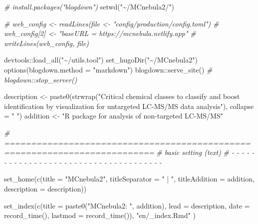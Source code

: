 \documentclass[
]{article}
\newenvironment{Shaded}{\begin{snugshade}}{\end{snugshade}}
\newcommand{\AttributeTok}[1]{\textcolor[rgb]{0.77,0.63,0.00}{#1}}
\newcommand{\CommentTok}[1]{\textcolor[rgb]{0.56,0.35,0.01}{\textit{#1}}}
\newcommand{\FunctionTok}[1]{\textcolor[rgb]{0.00,0.00,0.00}{#1}}
\newcommand{\NormalTok}[1]{#1}
\newcommand{\OtherTok}[1]{\textcolor[rgb]{0.56,0.35,0.01}{#1}}
\newcommand{\SpecialCharTok}[1]{\textcolor[rgb]{0.00,0.00,0.00}{#1}}
\newcommand{\StringTok}[1]{\textcolor[rgb]{0.31,0.60,0.02}{#1}}
\begin{document}
\begin{Shaded}
\begin{Highlighting}[]
\CommentTok{\# install.packages("blogdown")}
\FunctionTok{setwd}\NormalTok{(}\StringTok{"\textasciitilde{}/MCnebula2/"}\NormalTok{)}

\CommentTok{\# web\_config \textless{}{-} readLines(file \textless{}{-} "config/production/config.toml")}
\CommentTok{\# web\_config[2] \textless{}{-} "baseURL = \textquotesingle{}https://mcnebula.netlify.app\textquotesingle{}"}
\CommentTok{\# writeLines(web\_config, file)}

\NormalTok{devtools}\SpecialCharTok{::}\FunctionTok{load\_all}\NormalTok{(}\StringTok{"\textasciitilde{}/utils.tool"}\NormalTok{)}
\FunctionTok{set\_hugoDir}\NormalTok{(}\StringTok{"\textasciitilde{}/MCnebula2"}\NormalTok{)}
\FunctionTok{options}\NormalTok{(}\AttributeTok{blogdown.method =} \StringTok{"markdown"}\NormalTok{)}
\NormalTok{blogdown}\SpecialCharTok{::}\FunctionTok{serve\_site}\NormalTok{()}
\CommentTok{\# blogdown::stop\_server()}

\NormalTok{description }\OtherTok{\textless{}{-}} \FunctionTok{paste0}\NormalTok{(}\FunctionTok{strwrap}\NormalTok{(}\StringTok{"Critical chemical classes to classify and boost}
\StringTok{    identification by visualization for untargeted LC{-}MS/MS data analysis"}\NormalTok{),}
    \AttributeTok{collapse =} \StringTok{" "}\NormalTok{)}
\NormalTok{addition }\OtherTok{\textless{}{-}} \StringTok{"R package for analysis of non{-}targeted LC{-}MS/MS"}
\end{Highlighting}
\end{Shaded}

\begin{Shaded}
\begin{Highlighting}[]
\CommentTok{\# ==========================================================================}
\CommentTok{\# basic setting (text)}
\CommentTok{\# {-} {-} {-} {-} {-} {-} {-} {-} {-} {-} {-} {-} {-} {-} {-} {-} {-} {-} {-} {-} {-} {-} {-} {-} {-} {-} {-} {-} {-} {-} {-} {-} {-} {-} {-} {-} {-}}

\FunctionTok{set\_home}\NormalTok{(}\FunctionTok{c}\NormalTok{(}\AttributeTok{title =} \StringTok{"MCnebula2"}\NormalTok{,}
           \AttributeTok{titleSeparator =} \StringTok{" | "}\NormalTok{,}
           \AttributeTok{titleAddition =}\NormalTok{ addition,}
           \AttributeTok{description =}\NormalTok{ description))}

\FunctionTok{set\_index}\NormalTok{(}\FunctionTok{c}\NormalTok{(}\AttributeTok{title =} \FunctionTok{paste0}\NormalTok{(}\StringTok{"MCnebula2: "}\NormalTok{, addition),}
            \AttributeTok{lead =}\NormalTok{ description,}
            \AttributeTok{date =} \FunctionTok{record\_time}\NormalTok{(),}
            \AttributeTok{lastmod =} \FunctionTok{record\_time}\NormalTok{()),}
          \StringTok{"en/\_index.Rmd"}
\NormalTok{)}
\end{Highlighting}
\end{Shaded}
\end{document}
